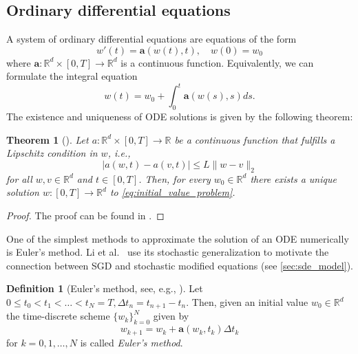 \documentclass[12pt]{article}
\newtheorem{theorem}{Theorem}[section]
\theoremstyle{definition}
\newtheorem{definition}[definition]{Definition}
\numberwithin{equation}{section}
\newcommand{\R}{\mathbb{R}}
\newcommand{\norm}[1]{\lVert{#1}\rVert_2}
\begin{document}
\subsection{Ordinary differential equations}
A system of ordinary differential equations are equations of the form
\begin{equation}
  \label{eq:initial_value_problem}
  w'(t) = \mathbf{a}(w(t),t), \quad w(0) = w_0
\end{equation}
where $\mathbf{a} : \R^d \times [0,T] \rightarrow \R^d$ is a continuous function. Equivalently, we can formulate the integral equation
\begin{equation}
  w(t) = w_0 + \int_0^t \mathbf{a}(w(s),s)ds.
\end{equation}
The existence and uniqueness of ODE solutions is given by the following theorem:
\begin{theorem}[]
  \label{thm:ode_existence}
  Let $a : \R^d \times [0,T] \rightarrow \R$ be a continuous function that fulfills a Lipschitz condition in $w$, i.e.,
  \begin{equation*}
    \lvert a(w,t) - a(v,t) \rvert \leq L \norm{w - v}
  \end{equation*}
  for all $w,v \in \R^d$ and $t \in [0,T]$. Then, for every $w_0 \in \R^d$ there exists a unique solution $w:[0,T] \rightarrow \R^d$ to \eqref{eq:initial_value_problem}.
\end{theorem}
\begin{proof}
  The proof can be found in .
\end{proof}
One of the simplest methods to approximate the solution of an ODE numerically is Euler's method. Li et al.\ \cite{liStochasticModifiedEquations2019} use its stochastic generalization to motivate the connection between SGD and stochastic modified equations (see \autoref{sec:sde_model}).
\begin{definition}[Euler's method, see, e.g., ]
  Let $0 \leq t_0 < t_1 < \dots < t_N = T, \Delta t_n = t_{n+1} - t_n$. Then, given an initial value $w_0 \in \R^d$ the time-discrete scheme $\{w_k\}_{k=0}^N$ given by
  \begin{equation}
    \label{eq:ode_euler}
    w_{k+1} = w_k + \mathbf{a}(w_k, t_k) \Delta t_k
  \end{equation}
  for $k=0,1,\dots,N$ is called \emph{Euler's method}.
\end{definition}
\end{document}
